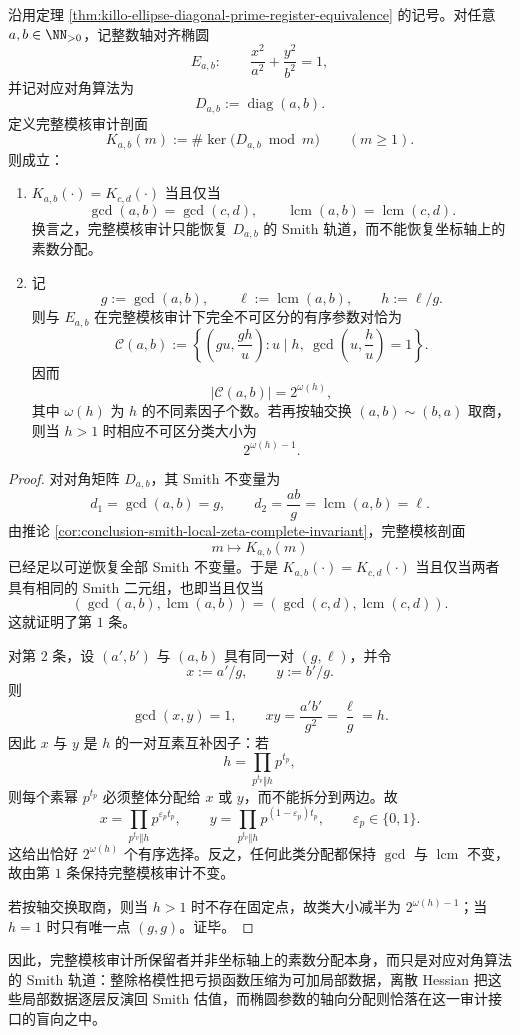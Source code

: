 \begin{theorem}\label{thm:conclusion-ellipse-kernel-audit-smith-orbit-blindness}
沿用定理 \ref{thm:killo-ellipse-diagonal-prime-register-equivalence} 的记号。对任意 \(a,b\in\NN_{>0}\)，记整数轴对齐椭圆
\[
E_{a,b}:\qquad \frac{x^2}{a^2}+\frac{y^2}{b^2}=1,
\]
并记对应对角算法为
\[
D_{a,b}:=\operatorname{diag}(a,b).
\]
定义完整模核审计剖面
\[
K_{a,b}(m):=\#\ker\!\bigl(D_{a,b}\bmod m\bigr)
\qquad(m\ge 1).
\]
则成立：
\begin{enumerate}
  \item \(K_{a,b}(\cdot)=K_{c,d}(\cdot)\) 当且仅当
  \[
  \gcd(a,b)=\gcd(c,d),
  \qquad
  \operatorname{lcm}(a,b)=\operatorname{lcm}(c,d).
  \]
  换言之，完整模核审计只能恢复 \(D_{a,b}\) 的 Smith 轨道，而不能恢复坐标轴上的素数分配。
  \item 记
  \[
  g:=\gcd(a,b),
  \qquad
  \ell:=\operatorname{lcm}(a,b),
  \qquad
  h:=\ell/g.
  \]
  则与 \(E_{a,b}\) 在完整模核审计下完全不可区分的有序参数对恰为
  \[
  \mathcal C(a,b)
  :=
  \left\{
  \left(gu,\frac{gh}{u}\right):
  u\mid h,\ \gcd\!\left(u,\frac{h}{u}\right)=1
  \right\}.
  \]
  因而
  \[
  |\mathcal C(a,b)|=2^{\omega(h)},
  \]
  其中 \(\omega(h)\) 为 \(h\) 的不同素因子个数。若再按轴交换 \((a,b)\sim(b,a)\) 取商，则当 \(h>1\) 时相应不可区分类大小为
  \[
  2^{\omega(h)-1}.
  \]
\end{enumerate}
\end{theorem}
\begin{proof}
对对角矩阵 \(D_{a,b}\)，其 Smith 不变量为
\[
d_1=\gcd(a,b)=g,
\qquad
d_2=\frac{ab}{g}=\operatorname{lcm}(a,b)=\ell.
\]
由推论 \ref{cor:conclusion-smith-local-zeta-complete-invariant}，完整模核剖面
\[
m\longmapsto K_{a,b}(m)
\]
已经足以可逆恢复全部 Smith 不变量。于是 \(K_{a,b}(\cdot)=K_{c,d}(\cdot)\) 当且仅当两者具有相同的 Smith 二元组，也即当且仅当
\[
(\gcd(a,b),\operatorname{lcm}(a,b))
=(\gcd(c,d),\operatorname{lcm}(c,d)).
\]
这就证明了第 \(1\) 条。

对第 \(2\) 条，设 \((a',b')\) 与 \((a,b)\) 具有同一对 \((g,\ell)\)，并令
\[
x:=a'/g,
\qquad
y:=b'/g.
\]
则
\[
\gcd(x,y)=1,
\qquad
xy=\frac{a'b'}{g^2}=\frac{\ell}{g}=h.
\]
因此 \(x\) 与 \(y\) 是 \(h\) 的一对互素互补因子：若
\[
h=\prod_{p^{t_p}\Vert h}p^{t_p},
\]
则每个素幂 \(p^{t_p}\) 必须整体分配给 \(x\) 或 \(y\)，而不能拆分到两边。故
\[
x=\prod_{p^{t_p}\Vert h}p^{\varepsilon_p t_p},
\qquad
y=\prod_{p^{t_p}\Vert h}p^{(1-\varepsilon_p)t_p},
\qquad
\varepsilon_p\in\{0,1\}.
\]
这给出恰好 \(2^{\omega(h)}\) 个有序选择。反之，任何此类分配都保持 \(\gcd\) 与 \(\operatorname{lcm}\) 不变，故由第 \(1\) 条保持完整模核审计不变。

若按轴交换取商，则当 \(h>1\) 时不存在固定点，故类大小减半为 \(2^{\omega(h)-1}\)；当 \(h=1\) 时只有唯一点 \((g,g)\)。证毕。
\end{proof}

\noindent
因此，完整模核审计所保留者并非坐标轴上的素数分配本身，而只是对应对角算法的 Smith 轨道：整除格模性把亏损函数压缩为可加局部数据，离散 Hessian 把这些局部数据逐层反演回 Smith 估值，而椭圆参数的轴向分配则恰落在这一审计接口的盲向之中。

\endinput
